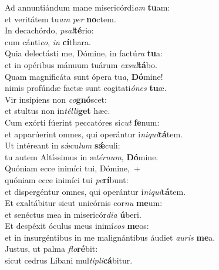\evenverse Ad annuntiándum mane misericórdi\textit{am} \textbf{tu}am:~\*\\
\evenverse et veritátem tu\textit{am} \textit{per} \textbf{no}ctem.\\
\oddverse In decachórdo, \textit{psal}\textbf{té}rio:~\*\\
\oddverse cum cánti\textit{co}, \textit{in} \textbf{cí}thara.\\
\evenverse Quia delectásti me, Dómine, in factú\textit{ra} \textbf{tu}a:~\*\\
\evenverse et in opéribus mánuum tuárum \textit{ex}\textit{sul}\textbf{tá}bo.\\
\oddverse Quam magnificáta sunt ópera tu\textit{a}, \textbf{Dó}mine!~\*\\
\oddverse nimis profúndæ factæ sunt cogitati\textit{ó}\textit{nes} \textbf{tu}æ.\\
\evenverse Vir insípiens non \textit{co}\textbf{gnó}scet:~\*\\
\evenverse et stultus non in\textit{tél}\textit{li}\textbf{get} hæc.\\
\oddverse Cum exórti fúerint peccatóres si\textit{cut} \textbf{fe}num:~\*\\
\oddverse et apparúerint omnes, qui operántur i\textit{ni}\textit{qui}\textbf{tá}tem.\\
\evenverse Ut intéreant in sǽcu\textit{lum} \textbf{sǽ}culi:~\*\\
\evenverse tu autem Altíssimus in æ\textit{tér}\textit{num}, \textbf{Dó}mine.\\
\oddverse Quóniam ecce inimíci tui, Dómine,~+\\
\oddverse  quóniam ecce inimíci tui \textit{pe}\textbf{rí}bunt:~\*\\
\oddverse et dispergéntur omnes, qui operántur i\textit{ni}\textit{qui}\textbf{tá}tem.\\
\evenverse Et exaltábitur sicut unicórnis cor\textit{nu} \textbf{me}um:~\*\\
\evenverse et senéctus mea in misericór\textit{di}\textit{a} \textbf{ú}beri.\\
\oddverse Et despéxit óculus meus inimí\textit{cos} \textbf{me}os:~\*\\
\oddverse et in insurgéntibus in me malignántibus áudiet \textit{au}\textit{ris} \textbf{me}a.\\
\evenverse Justus, ut palma \textit{flo}\textbf{ré}bit:~\*\\
\evenverse sicut cedrus Líbani mul\textit{ti}\textit{pli}\textbf{cá}bitur.\\
